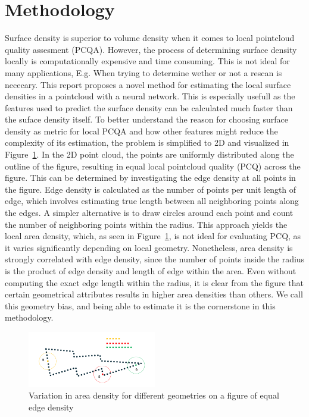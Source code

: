 \section{Methodology}
Surface density is superior to volume density when it comes to local pointcloud quality assesment (PCQA). However, the process of determining surface density locally is computationally expensive and time consuming. This is not ideal for many applications, E.g. When trying to determine wether or not a rescan is nececary. This report proposes a novel method for estimating the local surface densities in a pointcloud with a neural network. This is especially usefull as the features used to predict the surface density can be calculated much faster than the suface density itself. 
To better understand the reason for choosing surface density as metric for local PCQA and how other features might reduce the complexity of its estimation, the problem is simplified to 2D and visualized in Figure~\ref{fig:area_and_circumference}. In the 2D point cloud, the points are uniformly distributed along the outline of the figure, resulting in equal local pointcloud quality (PCQ) across the figure. This can be determined by investigating the edge density at all points in the figure. Edge density is calculated as the number of points per unit length of edge, which involves estimating true length between all neighboring points along the edges. 
A simpler alternative is to draw circles around each point and count the number of neighboring points within the radius. This approach yields the local area density, which, as seen in Figure~\ref{fig:area_and_circumference}, is not ideal for evaluating PCQ, as it varies significantly depending on local geometry. Nonetheless, area density is strongly correlated with edge density, since the number of points inside the radius is the product of edge density and length of edge within the area. 
Even without computing the exact edge length within the radius, it is clear from the figure that certain geometrical attributes results in higher area densities than others. We call this geometry bias, and being able to estimate it is the cornerstone in this methodology.

\begin{figure}[H]
    \centering
    \includegraphics[width=0.5\textwidth]{figures/Points_inside.png}
    \caption{Variation in area density for different geometries on a figure of equal edge density}\label{fig:area_and_circumference}
\end{figure}

